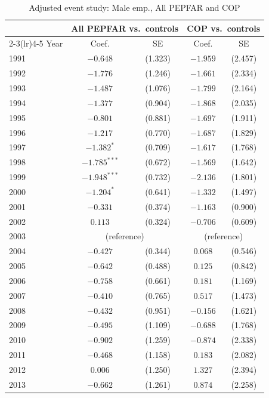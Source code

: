 \begin{table}[htbp]
\centering
\small
\caption{Adjusted event study: Male emp., All PEPFAR and COP}
\label{tab:es_combined_emp_male}
\begin{tabular}{lcccc}
\toprule
 & \multicolumn{2}{c}{All PEPFAR vs.\ controls} & \multicolumn{2}{c}{COP vs.\ controls} \\
\cmidrule(lr){2-3}\cmidrule(lr){4-5}
Year & Coef. & SE & Coef. & SE \\
\midrule
1991 & $-0.648$ & (1.323) & $-1.959$ & (2.457) \\
1992 & $-1.776$ & (1.246) & $-1.661$ & (2.334) \\
1993 & $-1.487$ & (1.076) & $-1.799$ & (2.164) \\
1994 & $-1.377$ & (0.904) & $-1.868$ & (2.035) \\
1995 & $-0.801$ & (0.881) & $-1.697$ & (1.911) \\
1996 & $-1.217$ & (0.770) & $-1.687$ & (1.829) \\
1997 & $-1.382^{*}$ & (0.709) & $-1.617$ & (1.768) \\
1998 & $-1.785^{***}$ & (0.672) & $-1.569$ & (1.642) \\
1999 & $-1.948^{***}$ & (0.732) & $-2.136$ & (1.801) \\
2000 & $-1.204^{*}$ & (0.641) & $-1.332$ & (1.497) \\
2001 & $-0.331$ & (0.374) & $-1.163$ & (0.900) \\
2002 & $0.113$ & (0.324) & $-0.706$ & (0.609) \\
2003 & \multicolumn{2}{c}{(reference)} & \multicolumn{2}{c}{(reference)} \\
2004 & $-0.427$ & (0.344) & $0.068$ & (0.546) \\
2005 & $-0.642$ & (0.488) & $0.125$ & (0.842) \\
2006 & $-0.758$ & (0.661) & $0.181$ & (1.169) \\
2007 & $-0.410$ & (0.765) & $0.517$ & (1.473) \\
2008 & $-0.432$ & (0.951) & $-0.156$ & (1.621) \\
2009 & $-0.495$ & (1.109) & $-0.688$ & (1.768) \\
2010 & $-0.902$ & (1.259) & $-0.874$ & (2.338) \\
2011 & $-0.468$ & (1.158) & $0.183$ & (2.082) \\
2012 & $0.006$ & (1.250) & $1.327$ & (2.394) \\
2013 & $-0.662$ & (1.261) & $0.874$ & (2.258) \\

\end{tabular}
\end{table}
